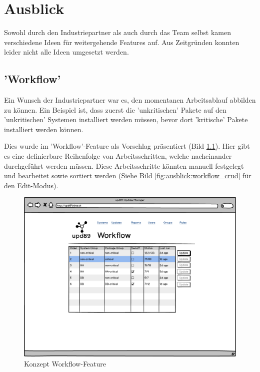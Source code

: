 \chapter{Ausblick}

Sowohl durch den Industriepartner als auch durch das Team selbst kamen verschiedene Ideen für weitergehende Features auf. Aus Zeitgründen konnten leider nicht alle Ideen umgesetzt werden.

\section{'Workflow'}

Ein Wunsch der Industriepartner war es, den momentanen Arbeitsablauf abbilden zu können. Ein Beispiel ist, dass zuerst die 'unkritischen' Pakete auf den 'unkritischen' Systemen installiert werden müssen, bevor dort 'kritische' Pakete installiert werden können.

Dies wurde im 'Workflow'-Feature als Vorschlag präsentiert (Bild \ref{fig:ausblick:workflow}). Hier gibt es eine definierbare Reihenfolge von Arbeitsschritten, welche nacheinander durchgeführt werden müssen. Diese Arbeitsschritte könnten manuell festgelegt und bearbeitet sowie sortiert werden (Siehe Bild \ref{fig:ausblick:workflow_crud} für den Edit-Modus).



\begin{figure}[H]
	\centering
	\includegraphics[width=\linewidth]{files/mockups/workflow}
	\caption{Konzept Workflow-Feature}
	\label{fig:ausblick:workflow}
\end{figure}

